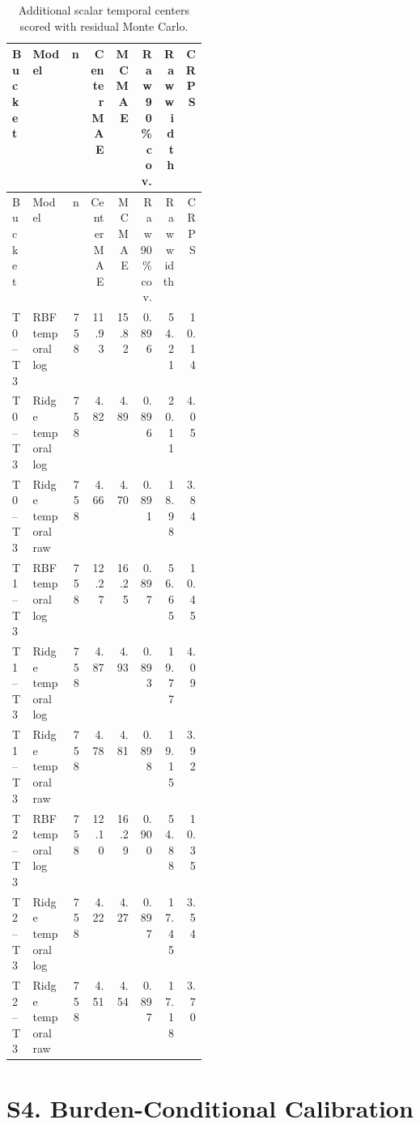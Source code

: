 \documentclass[10pt]{article}
\begin{document}
\small
\setlength{\tabcolsep}{3pt}
\renewcommand{\arraystretch}{1.08}
\begin{longtable}{@{}L{0.08\linewidth}L{0.20\linewidth}rrrrrr@{}}
\caption{Additional scalar temporal centers scored with residual Monte Carlo.}\label{tab:s-temporal-baselines}\\
\toprule
Bucket & Model & n & Center MAE & MC MAE & Raw 90\% cov. & Raw width & CRPS \\
\midrule
\endfirsthead
\toprule
Bucket & Model & n & Center MAE & MC MAE & Raw 90\% cov. & Raw width & CRPS \\
\midrule
\endhead
T0--T3 & RBF temporal log & 758 & 11.93 & 15.82 & 0.896 & 54.21 & 10.14 \\
T0--T3 & Ridge temporal log & 758 & 4.82 & 4.89 & 0.896 & 20.11 & 4.05 \\
T0--T3 & Ridge temporal raw & 758 & 4.66 & 4.70 & 0.891 & 18.98 & 3.84 \\
T1--T3 & RBF temporal log & 758 & 12.27 & 16.25 & 0.897 & 56.65 & 10.45 \\
T1--T3 & Ridge temporal log & 758 & 4.87 & 4.93 & 0.893 & 19.77 & 4.09 \\
T1--T3 & Ridge temporal raw & 758 & 4.78 & 4.81 & 0.898 & 19.15 & 3.92 \\
T2--T3 & RBF temporal log & 758 & 12.10 & 16.29 & 0.900 & 54.88 & 10.35 \\
T2--T3 & Ridge temporal log & 758 & 4.22 & 4.27 & 0.897 & 17.45 & 3.54 \\
T2--T3 & Ridge temporal raw & 758 & 4.51 & 4.54 & 0.897 & 17.18 & 3.70 \\
\bottomrule
\end{longtable}
\normalsize

\clearpage
\section*{S4. Burden-Conditional Calibration}
\end{document}
